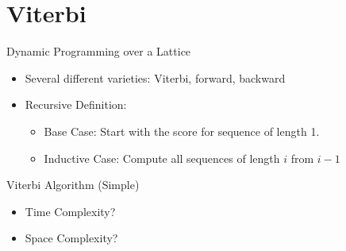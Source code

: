 \documentclass{beamer}
\def\Lattice{
    \matrix (network)
    [matrix of nodes,
    nodes in empty cells,
    ampersand replacement=\&,
    column sep={1cm},
    row sep={0.1cm},
    nodes={outer sep=0pt,circle,minimum size=0.5cm, minimum width=1.3cm,draw, rectangle} ]
    {
     O \& O \& O \& O \& O\\
     I-PER \& I-PER \& I-PER \& I-PER \& I-PER \\ 
     I-ORG \& I-ORG \& I-ORG \& I-ORG \& I-ORG \\ 
     I-LOC \& I-LOC \& I-LOC \& I-LOC \& I-LOC \\ 
     |[draw=none]| \\
     |[draw=none]| Mayor \& |[draw=none]| DeBlasio \& |[draw=none]| from \& |[draw=none]| New  \& |[draw=none]| York  \\  
};
}
\begin{document}
\section{Viterbi}

\begin{frame}{Dynamic Programming over a Lattice}
  \begin{itemize}
  \item Several different varieties: Viterbi, forward, backward

  \item Recursive Definition:
    \begin{itemize}
    \item Base Case: Start with the score for sequence of length 1.  \air
    \item Inductive Case: Compute all sequences of length $i$ from $i-1$ 
    \end{itemize}
  \end{itemize}

  \begin{center}   
  \end{center}  

\end{frame}

\begin{frame}{Viterbi Algorithm (Simple)}
  \begin{algorithmic}
    \EndFor{}
    \EndFor{}
    \EndProcedure{}
  \end{algorithmic}
  \begin{itemize}
  \item Time Complexity?
  \item Space Complexity?
  \end{itemize}
\end{frame}
\end{document}
